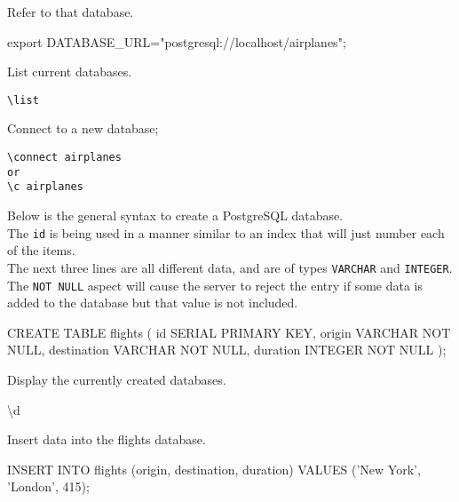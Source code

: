 \documentclass[]{book}
\newenvironment{Shaded}{\begin{snugshade}}{\end{snugshade}}
\newcommand{\StringTok}[1]{\textcolor[rgb]{0.31,0.60,0.02}{#1}}
\newcommand{\FunctionTok}[1]{\textcolor[rgb]{0.00,0.00,0.00}{#1}}
\newcommand{\VariableTok}[1]{\textcolor[rgb]{0.00,0.00,0.00}{#1}}
\newcommand{\BuiltInTok}[1]{#1}
\newcommand{\ExtensionTok}[1]{#1}
\newcommand{\NormalTok}[1]{#1}
\begin{document}
Refer to that database.

\begin{Shaded}
\begin{Highlighting}[]
\BuiltInTok{export} \VariableTok{DATABASE_URL=}\StringTok{"postgresql://localhost/airplanes"}\NormalTok{;}
\end{Highlighting}
\end{Shaded}

List current databases.

\begin{verbatim}
\list
\end{verbatim}

Connect to a new database;

\begin{verbatim}
\connect airplanes
or
\c airplanes
\end{verbatim}

Below is the general syntax to create a PostgreSQL database.\\
The \texttt{id} is being used in a manner similar to an index that will
just number each of the items.\\
The next three lines are all different data, and are of types
\texttt{VARCHAR} and \texttt{INTEGER}.\\
The \texttt{NOT\ NULL} aspect will cause the server to reject the entry
if some data is added to the database but that value is not included.

\begin{Shaded}
\begin{Highlighting}[]
\ExtensionTok{CREATE}\NormalTok{ TABLE flights (           }
    \FunctionTok{id}\NormalTok{ SERIAL PRIMARY KEY,       }
    \ExtensionTok{origin}\NormalTok{ VARCHAR NOT NULL,     }
    \ExtensionTok{destination}\NormalTok{ VARCHAR NOT NULL,}
    \ExtensionTok{duration}\NormalTok{ INTEGER NOT NULL    }
\NormalTok{);                               }
\end{Highlighting}
\end{Shaded}

Display the currently created databases.

\begin{Shaded}
\begin{Highlighting}[]
\NormalTok{\textbackslash{}}\ExtensionTok{d}
\end{Highlighting}
\end{Shaded}

Insert data into the flights database.

\begin{Shaded}
\begin{Highlighting}[]
\ExtensionTok{INSERT}\NormalTok{ INTO flights (origin, destination, duration) }\ExtensionTok{VALUES}\NormalTok{ (}\StringTok{'New York'}\NormalTok{, }\StringTok{'London'}\NormalTok{, 415);}
\end{Highlighting}
\end{Shaded}
\end{document}
